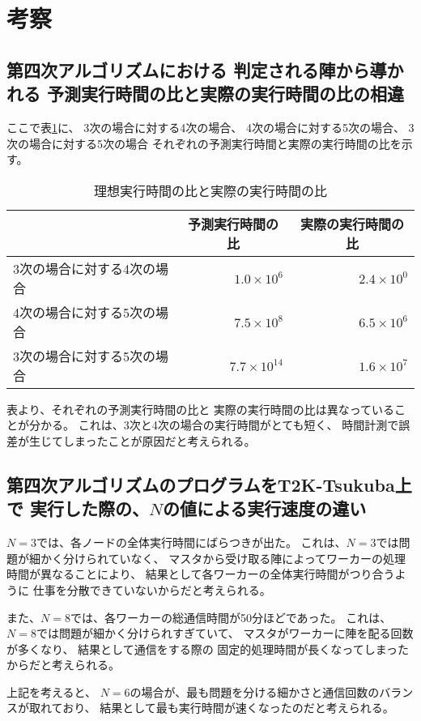 \section{考察}
\subsection{第四次アルゴリズムにおける
		判定される陣から導かれる
		予測実行時間の比と実際の実行時間の比の相違}
	ここで表\ref{tab:bohemian-rhapsody}に、
	3次の場合に対する4次の場合、
	4次の場合に対する5次の場合、
	3次の場合に対する5次の場合
	それぞれの予測実行時間と実際の実行時間の比を示す。

\begin{table}[htb]
	\begin{center}
	\begin{tabular}{|l||r|r|}
\hline
& \multicolumn{1}{|c|}{予測実行時間の比} & \multicolumn{1}{|c|}{実際の実行時間の比} \\
\hline\hline
3次の場合に対する4次の場合 & $1.0 \times 10^6$  & $2.4 \times 10^0$ \\\hline
4次の場合に対する5次の場合 & $7.5 \times 10^8$  & $6.5 \times 10^6$ \\\hline
3次の場合に対する5次の場合 & $7.7 \times 10^{14}$  & $1.6 \times 10^7$ \\\hline
	\end{tabular}
	\end{center}
	\caption{理想実行時間の比と実際の実行時間の比}
	\label{tab:bohemian-rhapsody}
\end{table}

表より、それぞれの予測実行時間の比と
実際の実行時間の比は異なっていることが分かる。
これは、3次と4次の場合の実行時間がとても短く、
時間計測で誤差が生じてしまったことが原因だと考えられる。


\subsection{第四次アルゴリズムのプログラムをT2K-Tsukuba上で
		実行した際の、$N$の値による実行速度の違い}
$N=3$では、各ノードの全体実行時間にばらつきが出た。
これは、$N=3$では問題が細かく分けられていなく、
マスタから受け取る陣によってワーカーの処理時間が異なることにより、
結果として各ワーカーの全体実行時間がつり合うように
仕事を分散できていないからだと考えられる。

また、$N=8$では、各ワーカーの総通信時間が50分ほどであった。
これは、$N=8$では問題が細かく分けられすぎていて、
マスタがワーカーに陣を配る回数が多くなり、
結果として通信をする際の
固定的処理時間が長くなってしまったからだと考えられる。

上記を考えると、
$N=6$の場合が、最も問題を分ける細かさと通信回数のバランスが取れており、
結果として最も実行時間が速くなったのだと考えられる。
